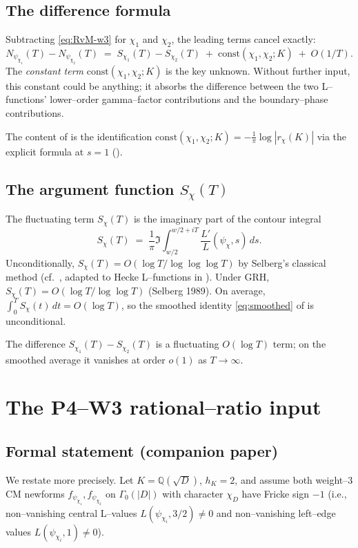 \documentclass[11pt]{amsart}
\theoremstyle{definition}
\theoremstyle{remark}
\newcommand{\Q}{\mathbb{Q}}
\begin{document}
\subsection{The difference formula}\label{ssec:diff}
Subtracting \eqref{eq:RvM-w3} for \(\chi_1\) and \(\chi_2\), the
leading terms cancel exactly:
\begin{equation}\label{eq:diff-RvM}
  N_{\psi_{\chi_1}}(T) - N_{\psi_{\chi_2}}(T)
  \;=\;
  S_{\chi_1}(T) - S_{\chi_2}(T)
  \;+\;
  \mathrm{const}(\chi_1, \chi_2; K) \;+\; O(1/T) .
\end{equation}
The \emph{constant term} \(\mathrm{const}(\chi_1, \chi_2; K)\) is the
key unknown. Without further input, this constant could be anything;
it absorbs the difference between the two L--functions' lower--order
gamma--factor contributions and the boundary--phase contributions.

The content of  is the identification
\(\mathrm{const}(\chi_1, \chi_2; K) = -\tfrac{1}{\pi}\log|r_\chi(K)|\)
via the explicit formula at \(s = 1\) ().

\subsection{The argument function \(S_\chi(T)\)}\label{ssec:S-chi}
The fluctuating term \(S_\chi(T)\) is the imaginary part of the
contour integral
\begin{equation}\label{eq:S-chi-def}
  S_\chi(T)
  \;=\;
  \frac{1}{\pi} \Im\!\int_{w/2}^{w/2 + iT}
  \frac{L'}{L}(\psi_\chi, s)\,ds .
\end{equation}
Unconditionally, \(S_\chi(T) = O(\log T / \log\log\log T)\) by
Selberg's classical method (cf.\ \cite[§13.5]{Titchmarsh1986}, adapted
to Hecke L--functions in \cite{IwaniecKowalski2004}). Under GRH,
\(S_\chi(T) = O(\log T / \log\log T)\) (Selberg 1989). On average,
\(\int_0^T S_\chi(t)\,dt = O(\log T)\), so the smoothed identity
\eqref{eq:smoothed} of  is unconditional.

The difference \(S_{\chi_1}(T) - S_{\chi_2}(T)\) is a fluctuating
\(O(\log T)\) term; on the smoothed average it vanishes at order
\(o(1)\) as \(T \to \infty\).

\section{The P4--W3 rational--ratio input}\label{sec:p4w3}

\subsection{Formal statement (companion paper)}\label{ssec:p4w3-formal}
We restate  more precisely. Let \(K = \Q(\sqrt D)\),
\(h_K = 2\), and assume both weight--\(3\) CM newforms
\(f_{\psi_{\chi_1}}, f_{\psi_{\chi_2}}\) on \(\Gamma_0(|D|)\) with
character \(\chi_D\) have Fricke sign \(-1\) (i.e.,
non--vanishing central L--values \(L(\psi_{\chi_i}, 3/2) \neq 0\) and
non--vanishing left--edge values \(L(\psi_{\chi_i}, 1) \neq 0\)).
\end{document}
